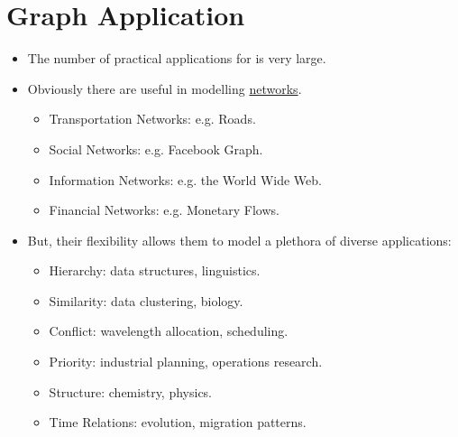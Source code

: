 \documentclass[12pt]{article}
\begin{document}
\section{Graph Application}
\renewcommand{\labelitemii}{$\circ$}
\renewcommand{\labelitemiii}{$\cdot$}
\renewcommand{\labelitemiii}{$\rightarrow$}
\renewcommand{\labelitemiv}{$\star$}
\begin{itemize}
\item The number of practical applications for is very large.
\item Obviously there are useful in modelling \underline{networks}.
	\begin{itemize}
	\item Transportation Networks: e.g. Roads.
	\item Social Networks: e.g. Facebook Graph.
	\item Information Networks: e.g. the World Wide Web.
	\item Financial Networks: e.g. Monetary Flows.
	\end{itemize}
\item But, their flexibility allows them to model a plethora of diverse applications:
	\begin{itemize}
	\item Hierarchy: data structures, linguistics.
	\item Similarity: data clustering, biology.
	\item Conflict: wavelength allocation, scheduling.
	\item Priority: industrial planning, operations research.
	\item Structure: chemistry, physics.
	\item Time Relations: evolution, migration patterns.
	\end{itemize}
\end{itemize}
\end{document}
